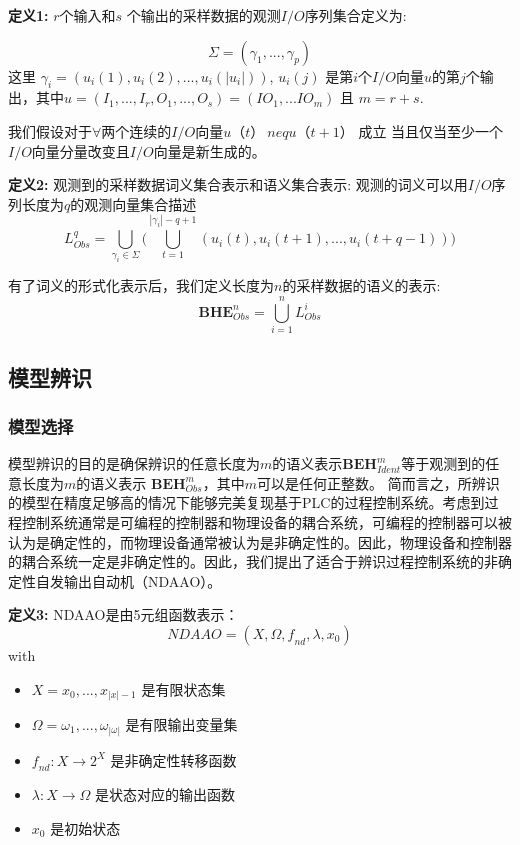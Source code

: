 \textbf{定义1:} \( r \)个输入和$ s $ 个输出的采样数据的观测$I/O$序列集合定义为:

\begin{equation} 
\Sigma = (\gamma_1,...,\gamma_p) 
\end{equation} 这里 $\gamma_i = (u_i(1),u_i(2),...,u_i(|u_i|))$, $ u_i(j) $ 是第$i$个$I/O$向量$u$的第$j$个输出，其中$ u = (I_1,...,I_r,O_1,...,O_s) = (IO_1,...IO_m) $ 且 $ m=r+s $.

我们假设对于$ \forall $两个连续的$I/O$向量$ u（t）\ neq u（t + 1）$ 成立
当且仅当至少一个$I/O$向量分量改变且$I/O$向量是新生成的。

\textbf{定义2:} 观测到的采样数据词义集合表示和语义集合表示: 观测的词义可以用$I/O$序列长度为$q$的观测向量集合描述 
\[
L_{Obs}^q = \bigcup_{\gamma_i \in \Sigma} \Big(\bigcup_{t=1}^{|\gamma_i|-q+1} (u_i(t),u_i(t+1),...,u_i(t+q-1))\Big) 
\]

有了词义的形式化表示后，我们定义长度为$n$的采样数据的语义的表示:
\begin{equation}
 \textbf{BHE}_{Obs}^n = \bigcup_{i=1}^n L_{Obs}^i 
\end{equation}

\subsection{模型辨识}

\subsubsection{模型选择}

模型辨识的目的是确保辨识的任意长度为$ m $的语义表示$ \textbf {BEH}_{Ident}^m $等于观测到的任意长度为$ m $的语义表示  \( \textbf{BEH}_{Obs}^m \)，其中$ m $可以是任何正整数。 简而言之，所辨识的模型在精度足够高的情况下能够完美复现基于PLC的过程控制系统。考虑到过程控制系统通常是可编程的控制器和物理设备的耦合系统，可编程的控制器可以被认为是确定性的，而物理设备通常被认为是非确定性的。因此，物理设备和控制器的耦合系统一定是非确定性的。因此，我们提出了适合于辨识过程控制系统的非确定性自发输出自动机（NDAAO）\parencite{klein2005}。

\textbf{定义3:} NDAAO是由5元组函数表示： \[ NDAAO=(X,\Omega,\textit{f}_{nd},\lambda,x_0) \] with\
\begin{itemize}
  \item $ X={x_0,...,x_{|x|-1}} $ 是有限状态集
  \item $ \Omega={\omega_1,...,\omega_{|\omega|}} $ 是有限输出变量集
  \item $ \textit{f}_{nd}: X\rightarrow 2^X $ 是非确定性转移函数
  \item $ \lambda: X\rightarrow \Omega $ 是状态对应的输出函数
  \item $x_0$ 是初始状态
\end{itemize}

